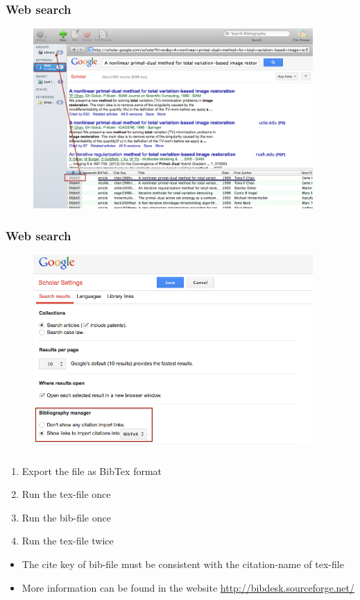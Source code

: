 \documentclass[notheorems,mathserif,table,compress,dvipsnames]{beamer}  %
\begin{document}
%
\begin{frame}
\frametitle{Web search}
\begin{figure}[!ht]
\includegraphics[width=4.2in]{bibdesk5}
\end{figure} 
\end{frame}

%
\begin{frame}
\frametitle{Web search}
\begin{figure}[!ht]
\includegraphics[width=4.2in]{bibdesk8}
\end{figure} 
\end{frame}

%
\begin{frame}
\frametitle{}
\begin{enumerate}
\item Export the file as BibTex format
\item Run the tex-file once
\item Run the bib-file once
\item Run the tex-file twice 
\end{enumerate}
\begin{itemize}
\item The cite key of bib-file must be consistent with the citation-name of tex-file
\item More information can be found in the website \url{http://bibdesk.sourceforge.net/}
\end{itemize}
\end{frame}
\end{document}
